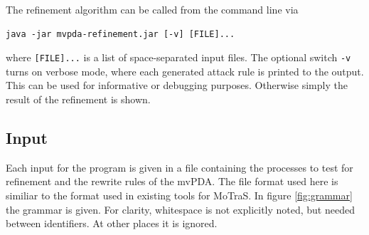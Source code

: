 The refinement algorithm can be called from the command line via
\begin{verbatim}
java -jar mvpda-refinement.jar [-v] [FILE]...
\end{verbatim}
where \verb+[FILE]...+ is a list of space-separated input files.
The optional switch \verb+-v+ turns on verbose mode, where each generated
attack rule is printed to the output. This can be used for informative
or debugging purposes.
Otherwise simply the result of the refinement is shown.



\subsection{Input}

Each input for the program is given in a file containing the processes
to test for refinement and the rewrite rules of the mvPDA.
The file format used here is similiar to the format used in existing
tools \cite{Sickert12} for MoTraS.
In figure \ref{fig:grammar} the grammar is given. For clarity,
whitespace is not explicitly noted, but needed between identifiers.
At other places it is ignored.


